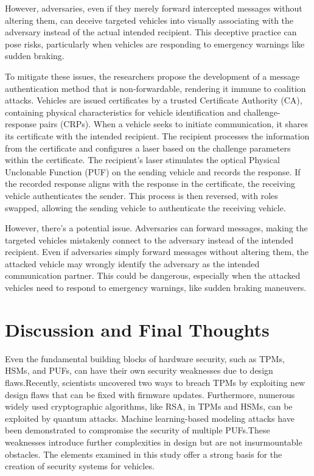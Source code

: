 \documentclass[conference]{IEEEtran}
\begin{document}
However, adversaries, even if they merely forward intercepted messages without altering them, can deceive targeted vehicles into visually associating with the adversary instead of the actual intended recipient. This deceptive practice can pose risks, particularly when vehicles are responding to emergency warnings like sudden braking.\par

To mitigate these issues, the researchers propose the development of a message authentication method that is non-forwardable, rendering it immune to coalition attacks. Vehicles are issued certificates by a trusted Certificate Authority (CA), containing physical characteristics for vehicle identification and challenge-response pairs (CRPs). When a vehicle seeks to initiate communication, it shares its certificate with the intended recipient. The recipient processes the information from the certificate and configures a laser based on the challenge parameters within the certificate. The recipient's laser stimulates the optical Physical Unclonable Function (PUF) on the sending vehicle and records the response. If the recorded response aligns with the response in the certificate, the receiving vehicle authenticates the sender. This process is then reversed, with roles swapped, allowing the sending vehicle to authenticate the receiving vehicle.\par

However, there's a potential issue. Adversaries can forward messages, making the targeted vehicles mistakenly connect to the adversary instead of the intended recipient. Even if adversaries simply forward messages without altering them, the attacked vehicle may wrongly identify the adversary as the intended communication partner. This could be dangerous, especially when the attacked vehicles need to respond to emergency warnings, like sudden braking maneuvers.
\section{Discussion and Final Thoughts  }
Even the fundamental building blocks of hardware security, such as TPMs, HSMs, and PUFs, can have their own security weaknesses due to design flaws.Recently, scientists uncovered two ways to breach TPMs by exploiting new design flaws that can be fixed with firmware updates. \cite{han2018bad}Furthermore, numerous widely used cryptographic algorithms, like RSA, in TPMs and HSMs, can be exploited by quantum attacks. \cite{chen2016report}
Machine learning-based modeling attacks have been demonstrated to compromise the security of multiple PUFs.\cite{delvaux2019machine}These weaknesses introduce further complexities in design but are not insurmountable obstacles. The elements examined in this study offer a strong basis for the creation of security systems for vehicles.\cite{labrado2019hardware1}
\end{document}
